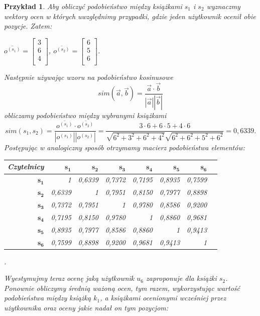 \documentclass[12pt,a4paper]{report}
\newtheorem{przyklad}{Przykład}[chapter]
\begin{document}
\begin{przyklad}
Aby obliczyć podobieństwo między książkami $s_1$ i $s_2$ wyznaczmy wektory ocen w których uwzględnimy przypadki, gdzie jeden użytkownik ocenił obie pozycje.
Zatem:
\begin{center}
$\overline{o^{(s_1)}} = \left[
        \begin{array}{c}
         3 \\
         6 \\
         4 \\
         \end{array}
      \right]$, $\overline{o^{(s_2)}} = \left[
        \begin{array}{c}
         6 \\
         5 \\
         6 \\
         \end{array}
      \right]$.
\end{center}
Następnie używając wzoru na podobieństwo kosinusowe
$$
sim(\overrightarrow{a},\overrightarrow{b}) = \frac{\overrightarrow{a} \cdot \overrightarrow{b}}{|\overrightarrow{a}||\overrightarrow{b}|}
$$ 
obliczamy podobieństwo między wybranymi książkami
$$
sim(s_1,s_2) = \frac{\overline{o^{(s_1)}} \cdot \overline{o^{(s_2)}}}{|o^{(s_1)}||o^{(s_2)}|} = \frac{3 \cdot 6 + 6 \cdot 5 + 4 \cdot 6}{\sqrt{6^2 + 3^2 + 6^2 + 4^2} \sqrt{6^2 + 6^2 + 5^2 + 6^2}} = 0,6339.
$$
Postępując w analogiczny sposób otrzymamy macierz podobieństwa elementów:
\begin{center}
\begin{tabular}{|r|r|r|r|r|r|r|r|} \hline
\textbf{Czytelnicy} & $\mathbf{s_1}$ & $\mathbf{s_2}$ & $\mathbf{s_3}$ & $\mathbf{s_4}$ & $\mathbf{s_5}$ & $\mathbf{s_6}$ \\
\hline
$\mathbf{s_1}$ & 1 & 0,6339 & 0,7372 & 0,7195 & 0,8935 & 0,7599 \\
\hline
$\mathbf{s_2}$ & 0,6339 & 1 & 0,7951 & 0,8150 & 0,7977 & 0,8898 \\
\hline
$\mathbf{s_3}$ & 0,7372 & 0,7951 & 1 & 0,9780 & 0,8586 & 0,9200 \\
\hline
$\mathbf{s_4}$ & 0,7195 & 0,8150 & 0,9780 & 1 & 0,8860 & 0,9681 \\
\hline 
$\mathbf{s_5}$ & 0,8935 & 0,7977 & 0,8586 & 0,8860 & 1 & 0,9413 \\
\hline 
$\mathbf{s_6}$ & 0,7599 & 0,8898 & 0,9200 & 0,9681 & 0,9413 & 1 \\
\hline 
\end{tabular}.
\end{center}
Wyestymujmy teraz ocenę jaką użytkownik $u_6$ zaproponuje dla książki $s_2$. Ponownie obliczymy średnią ważoną ocen, tym razem, wykorzystując wartość podobieństwa między książką $k_1$, a książkami ocenionymi wcześniej przez użytkownika oraz oceny jakie nadał on tym pozycjom:

\end{przyklad}
\end{document}

